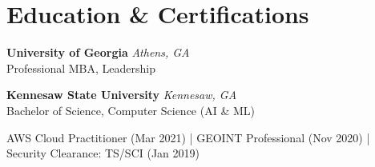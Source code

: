 \documentclass[a4paper,10pt]{article}
\begin{document}
\section*{Education \& Certifications}
\textbf{University of Georgia} \hfill \textit{Athens, GA} \\
Professional MBA, Leadership

\textbf{Kennesaw State University} \hfill \textit{Kennesaw, GA} \\
Bachelor of Science, Computer Science (AI \& ML)

\vspace{4pt}
AWS Cloud Practitioner (Mar 2021) \quad | \quad GEOINT Professional (Nov 2020) \quad | \quad Security Clearance: TS/SCI (Jan 2019)
\end{document}
